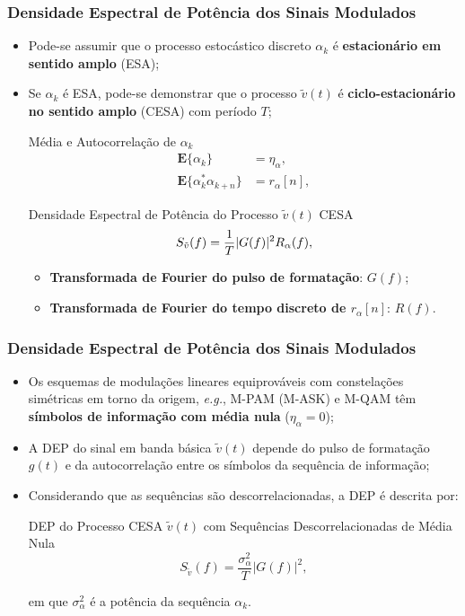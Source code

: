 \documentclass{beamer}
\newcommand{\pag}[1] {\begin{frame}#1\end{frame}}
\DeclarePairedDelimiter\abs{\lvert}{\rvert}%
\begin{document}
\pag{
	\frametitle{Densidade Espectral de Potência dos Sinais Modulados}
	\begin{itemize}
		\item Pode-se assumir que o processo estocástico discreto $\alpha_{k}$ é \textbf{estacionário em sentido amplo} (ESA);
		\item Se $\alpha_{k}$ é ESA, pode-se demonstrar que o processo $\tilde{v}(t)$ é \textbf{ciclo-estacionário no sentido amplo} (CESA) com período $T$;
	\begin{block}{Média e Autocorrelação de $\alpha_{k}$}
		\vspace{-0.5cm}
			\begin{subequations}
				\begin{align}
				        \mathbf{E}\{\alpha_{k}\} &= \eta_{\alpha},   \\
				        \mathbf{E}\{\alpha_{k}^{*}\alpha_{k+n}\} &= r_{\alpha}[n], \label{eq:MaxE}
				\end{align}
			\end{subequations}
	\end{block}	
	\begin{block}{Densidade Espectral de Potência do Processo $\tilde{v}(t)$ CESA}
		\begin{equation}
			S_{\tilde{v}}(f) = \frac{1}{T}\abs{G(f)}^2R_{\alpha}(f),
		\end{equation}
		\vspace{-0.3cm}
		\begin{itemize}
			\item \textbf{Transformada de Fourier do pulso de formatação}: $G(f)$;
			\item \textbf{Transformada de Fourier do tempo discreto de $r_{\alpha}[n]$}: $R(f)$.
		\end{itemize}
	\end{block}		
	\end{itemize}		
}

\pag{
	\frametitle{Densidade Espectral de Potência dos Sinais Modulados}
	\begin{itemize}
		\item Os esquemas de modulações lineares equiprováveis com constelações simétricas em torno da origem, \textit{e.g.}, M-PAM (M-ASK) e M-QAM têm \textbf{símbolos de informação com média nula} ($\eta_{\alpha} = 0$);
		\item A DEP do sinal em banda básica $\tilde{v}(t)$ depende do pulso de formatação $g(t)$ e da autocorrelação entre os símbolos da sequência de informação;
		\item Considerando que as sequências são descorrelacionadas, a DEP é descrita por:
	\begin{block}{DEP do Processo CESA $\tilde{v}(t)$ com Sequências Descorrelacionadas de Média Nula}
		\begin{equation}
			S_{\tilde{v}}(f) = \frac{\sigma_{\alpha}^2}{T}|G(f)|^2,
		\end{equation}
	\end{block}
em que $\sigma_{\alpha}^{2}$ é a potência da sequência $\alpha_{k}$.
	\end{itemize}
}
\end{document}
